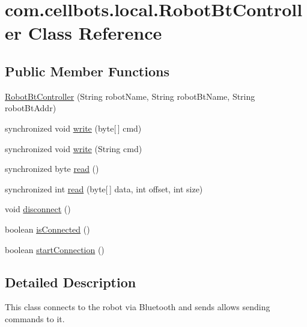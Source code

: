 \hypertarget{classcom_1_1cellbots_1_1local_1_1_robot_bt_controller}{\section{com.\-cellbots.\-local.\-Robot\-Bt\-Controller Class Reference}
\label{classcom_1_1cellbots_1_1local_1_1_robot_bt_controller}
}
\subsection*{Public Member Functions}
\begin{DoxyCompactItemize}
\item 
\hyperlink{classcom_1_1cellbots_1_1local_1_1_robot_bt_controller_a7e4a884781c4f709ab0f8314c7f073a0}{Robot\-Bt\-Controller} (String robot\-Name, String robot\-Bt\-Name, String robot\-Bt\-Addr)
\item 
synchronized void \hyperlink{classcom_1_1cellbots_1_1local_1_1_robot_bt_controller_a8d02f607706b20be4625c047ec4547b9}{write} (byte\mbox{[}$\,$\mbox{]} cmd)
\item 
synchronized void \hyperlink{classcom_1_1cellbots_1_1local_1_1_robot_bt_controller_a5b6987b9ec1dd3f8877339a00d9b46db}{write} (String cmd)
\item 
synchronized byte \hyperlink{classcom_1_1cellbots_1_1local_1_1_robot_bt_controller_a3cdde7124eb8a6bdcd467441c1796ec0}{read} ()
\item 
synchronized int \hyperlink{classcom_1_1cellbots_1_1local_1_1_robot_bt_controller_abd242e457a09745a102e53cfe58603eb}{read} (byte\mbox{[}$\,$\mbox{]} data, int offset, int size)
\item 
void \hyperlink{classcom_1_1cellbots_1_1local_1_1_robot_bt_controller_a8607e2e05a174241d53b1b3988c159d2}{disconnect} ()
\item 
boolean \hyperlink{classcom_1_1cellbots_1_1local_1_1_robot_bt_controller_afce315f42c8786555058d7ded3253dcb}{is\-Connected} ()
\item 
boolean \hyperlink{classcom_1_1cellbots_1_1local_1_1_robot_bt_controller_a3c68e12e02e7acdbd44f4952831ff3b0}{start\-Connection} ()
\end{DoxyCompactItemize}


\subsection{Detailed Description}
This class connects to the robot via Bluetooth and sends allows sending commands to it.

